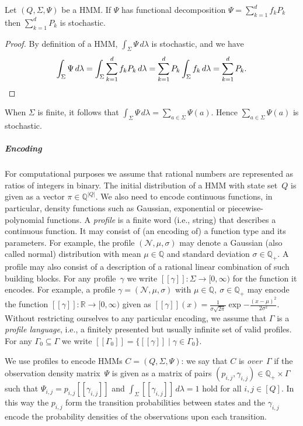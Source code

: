 \documentclass[a4paper,UKenglish,cleveref, autoref,mathscr, amsthm, thmtools, thm-restate]{lipics-v2019}
\newcommand{\RR}{\mathbb{R}}
\newcommand{\QQ}{\mathbb{Q}}
\newcommand{\1}{\mathbb{I}}
\begin{document}
\begin{lemma}\label{stochasticPk}
Let $(Q, \Sigma, \Psi)$ be a HMM.
If $\Psi$ has functional decomposition $\Psi =  \sum_{k = 1}^d f_k P_k$ then $\sum_{k = 1}^d P_k$ is stochastic.
\end{lemma}
\begin{proof}
By definition of a HMM, $\int_{\Sigma} \Psi\, d\lambda$ is stochastic, and we have
\begin{equation*}
\int_{\Sigma} \Psi\, d\lambda = \int_{\Sigma} \sum_{k = 1}^d f_k P_k\, d\lambda =  \sum_{k = 1}^d P_k  \int_{\Sigma} f_k\, d\lambda =  \sum_{k = 1}^d P_k.\qedhere
\end{equation*}
\end{proof}
When $\Sigma$ is finite, it follows that $\int_\Sigma \Psi\, d\lambda = \sum_{a \in \Sigma} \Psi(a)$. Hence $\sum_{a \in \Sigma} \Psi(a)$ is stochastic.

\subparagraph*{Encoding}
For computational purposes we assume that rational numbers are represented as ratios of integers in binary.
The initial distribution of a HMM with state set~$Q$ is given as a vector $\pi \in \QQ^{|Q|}$.
We also need to encode continuous functions, in particular, density functions such as Gaussian, exponential or piecewise-polynomial functions.
A \emph{profile} is a finite word (i.e., string) that describes a continuous function.
It may consist of (an encoding of) a function type and its parameters. For example, the profile  $(\mathcal{N}, \mu, \sigma)$ may denote a Gaussian (also called normal) distribution with mean $\mu \in \QQ$ and standard deviation $\sigma \in \QQ_+$. A profile may also consist of a description of a rational linear combination of such building blocks.
For any profile~$\gamma$ we write $[\![\gamma]\!] : \Sigma \rightarrow [0,\infty)$ for the function it encodes.
For example, a profile $\gamma = (\mathcal{N}, \mu, \sigma)$ with $\mu \in \QQ,\ \sigma \in \QQ_+$ may encode the function $[\![\gamma]\!] : \RR \rightarrow [0,\infty)$ given as $[\![\gamma]\!](x) = \frac{1}{\sigma\sqrt{2\pi}} \exp{- \frac{(x - \mu)^2}{2\sigma^2}}$.
Without restricting ourselves to any particular encoding, we assume that $\Gamma$ is a \emph{profile language}, i.e., a finitely presented but usually infinite set of valid profiles. For any $\Gamma_0 \subseteq \Gamma$ we write $[\![\Gamma_0]\!] = \{[\![\gamma]\!] \mid \gamma \in \Gamma_0\}$.

We use profiles to encode HMMs $C = (Q, \Sigma, \Psi)$:
we say that $C$ is \emph{over}~$\Gamma$ if the observation density matrix~$\Psi$ is given as a matrix of pairs $(p_{i,j}, \gamma_{i,j}) \in \QQ_+  \times \Gamma$ such that $\Psi_{i,j} = p_{i,j} [\![\gamma_{i,j}]\!]$ and $\int_{\Sigma} [\![\gamma_{i,j}]\!]\,d\lambda = 1$ hold for all $i,j \in [Q]$. In this way the $p_{i,j}$ form the transition probabilities between states and the $\gamma_{i,j}$ encode the probability densities of the observations upon each transition.
\end{document}
